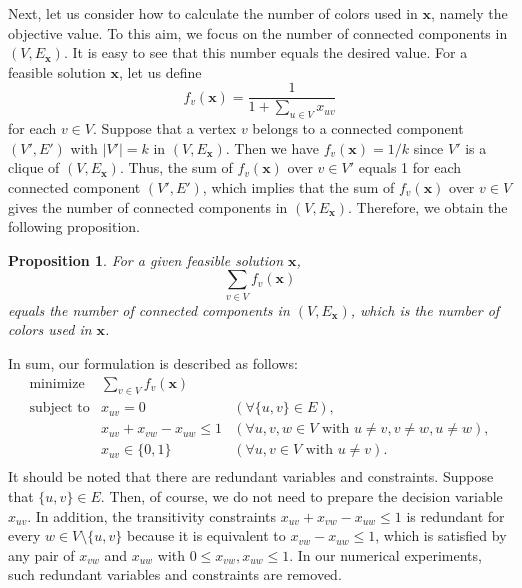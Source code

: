 \documentclass[11pt,a4paper]{article}
\newcommand{\bfx}{\boldsymbol{x}}
\newcommand{\ds}{\displaystyle}
\newtheorem{prop}[thm]{Proposition}
\begin{document}
\par

Next, let us consider how to calculate the number of colors used in $\bfx$, namely the objective value. 
To this aim, we focus on the number of connected components in $(V, E_{\bfx})$. 
It is easy to see that this number equals the desired value. 
For a feasible solution $\bfx$, let us define
\begin{equation*}
f_v(\bfx) = \frac{1}{\ds 1+\sum_{u \in V} x_{uv}} 
\end{equation*}
for each $v \in V$. 
Suppose that a vertex $v$ belongs to a connected component $(V', E')$ with $|V'|=k$ in $(V, E_{\bfx})$. 
Then we have $f_v(\bfx) = 1 / k$ since $V'$ is a clique of $(V, E_{\bfx})$. 
Thus, the sum of $f_v(\bfx)$ over $v \in V'$ equals 1 for each connected component $(V', E')$, 
which implies that the sum of $f_v(\bfx)$ over $v \in V$ gives the number of connected components in $(V, E_{\bfx})$. 
Therefore, we obtain the following proposition. 

\begin{prop}
For a given feasible solution $\bfx$, 
\begin{equation*}
\sum_{v \in V} f_v(\bfx)
\end{equation*}
equals the number of connected components in $(V, E_{\bfx})$, which is the number of colors used in $\bfx$. 
\end{prop}

In sum, our formulation is described as follows: 
\begin{equation*}
\begin{array}{llllllllllll}
\mbox{minimize}		&\ds \sum_{v \in V} f_v(\bfx)						&										\\
\mbox{subject to}	&x_{uv} = 0				&(\forall \{u,v\} \in E),							\\
			&x_{uv} + x_{vw} - x_{uw} \le 1		&(\forall u, v, w \in V \mbox{ with } u \not= v, v \not= w, u \not= w),		\\
			&x_{uv} \in \{0,1 \}			&(\forall u, v \in V \mbox{ with } u \not= v). 					\\
\end{array}
\end{equation*}
It should be noted that there are redundant variables and constraints. 
Suppose that $\{u, v\} \in E$. 
Then, of course, we do not need to prepare the decision variable $x_{uv}$. 
In addition, the transitivity constraints 
$x_{uv} + x_{vw} - x_{uw} \le 1$ is redundant for every $w \in V \setminus \{u, v\}$ 
because it is equivalent to $x_{vw} - x_{uw} \le 1$, 
which is satisfied by any pair of $x_{vw}$ and $x_{uw}$ with $0 \le x_{vw}, x_{uw} \le 1$. 
In our numerical experiments, such redundant variables and constraints are removed. 
\end{document}
